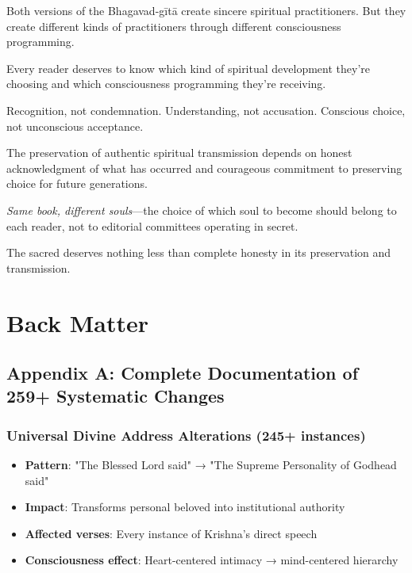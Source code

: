 \documentclass[11pt,twoside]{book}
\begin{document}
Both versions of the Bhagavad-gītā create sincere spiritual practitioners. But they create different kinds of practitioners through different consciousness programming.

Every reader deserves to know which kind of spiritual development they're choosing and which consciousness programming they're receiving.

Recognition, not condemnation. Understanding, not accusation. Conscious choice, not unconscious acceptance.

The preservation of authentic spiritual transmission depends on honest acknowledgment of what has occurred and courageous commitment to preserving choice for future generations.

\textit{Same book, different souls}—the choice of which soul to become should belong to each reader, not to editorial committees operating in secret.

The sacred deserves nothing less than complete honesty in its preservation and transmission.
\part*{Back Matter}
\label{sec:org36b754e}

\chapter*{Appendix A: Complete Documentation of 259+ Systematic Changes}
\label{sec:orgf3d9c89}

\section*{Universal Divine Address Alterations (245+ instances)}
\label{sec:org7dd9fa5}
\begin{itemize}
\item \textbf{\textbf{Pattern}}: "The Blessed Lord said" → "The Supreme Personality of Godhead said"
\item \textbf{\textbf{Impact}}: Transforms personal beloved into institutional authority
\item \textbf{\textbf{Affected verses}}: Every instance of Krishna's direct speech
\item \textbf{\textbf{Consciousness effect}}: Heart-centered intimacy → mind-centered hierarchy
\end{itemize}
\end{document}
